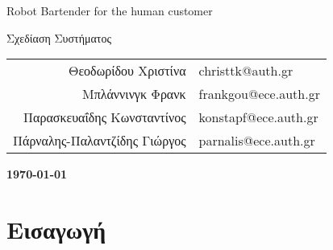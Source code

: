\documentclass[11pt]{article}
\date{\today}
\begin{document}
  \thispagestyle{firstpage}
  

  \begin{center}
    \Large Robot Bartender for the human customer
    \vspace{1cm}
    
    {\titlefont \Huge Σχεδίαση Συστήματος}
  \end{center}
  
  \vspace{5cm}
  \vfill
  
  \begin{flushright}
    \titlefont \footnotesize
    \begin{tabular}{r l}
      Θεοδωρίδου Χριστίνα&christtk@auth.gr\\
      Μπλάννινγκ Φρανκ&frankgou@ece.auth.gr\\
      Παρασκευαΐδης Κωνσταντίνος&konstapf@ece.auth.gr\\
      Πάρναλης-Παλαντζίδης Γιώργος&parnalis@ece.auth.gr\\
    \end{tabular}
    
    \large 
    \vspace{1.5cm}
    \textbf{\today}
    \vspace{.5cm}
  \end{flushright}
  \hrulefill
  \vspace{2.5cm}

  \newpage

  \tableofcontents

  \newpage
  \section{Εισαγωγή}
  
\end{document}
